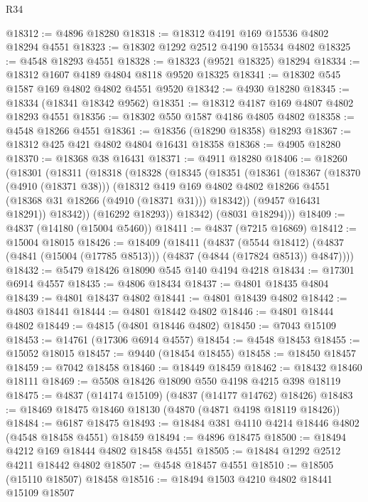 \begin{lexlean}{R34}
\begin{coremodule}
@18312 := @4896 @18280
@18318 := @18312 @4191 @169 @15536 @4802 @18294 @4551
@18323 := @18302 @1292 @2512 @4190 @15534 @4802
@18325 := @4548 @18293 @4551
@18328 := @18323 (@9521 @18325) @18294
@18334 := @18312 @1607 @4189 @4804 @8118 @9520 @18325
@18341 := @18302 @545 @1587 @169 @4802 @4802 @4551 @9520
@18342 := @4930 @18280
@18345 := @18334 (@18341 @18342 @9562)
@18351 := @18312 @4187 @169 @4807 @4802 @18293 @4551
@18356 := @18302 @550 @1587 @4186 @4805 @4802
@18358 := @4548 @18266 @4551
@18361 := @18356 (@18290 @18358) @18293
@18367 := @18312 @425 @421 @4802 @4804 @16431 @18358
@18368 := @4905 @18280
@18370 := @18368 @38 @16431
@18371 := @4911 @18280
@18406 := @18260
    (@18301
      (@18311
        (@18318
          (@18328
            (@18345
              (@18351
                (@18361
                  (@18367
                    (@18370 (@4910 (@18371 @38)))
                    (@18312
                      @419
                      @169
                      @4802
                      @4802
                      @18266
                      @4551
                      (@18368 @31 @18266 (@4910 (@18371 @31)))
                      @18342))
                  (@9457 @16431 @18291))
                @18342))
            (@16292 @18293))
          @18342)
        (@8031 @18294)))
@18409 := @4837 (@14180 (@15004 @5460))
@18411 := @4837 (@7215 @16869)
@18412 := @15004 @18015
@18426 := @18409
    (@18411
      (@4837
        (@5544 @18412)
        (@4837 (@4841 (@15004 (@17785 @8513))) (@4837 (@4844 (@17824 @8513)) @4847))))
@18432 := @5479 @18426 @18090 @545 @140 @4194 @4218
@18434 := @17301 @6914 @4557
@18435 := @4806 @18434
@18437 := @4801 @18435 @4804
@18439 := @4801 @18437 @4802
@18441 := @4801 @18439 @4802
@18442 := @4803 @18441
@18444 := @4801 @18442 @4802
@18446 := @4801 @18444 @4802
@18449 := @4815 (@4801 @18446 @4802)
@18450 := @7043 @15109
@18453 := @14761 (@17306 @6914 @4557)
@18454 := @4548 @18453
@18455 := @15052 @18015
@18457 := @9440 (@18454 @18455)
@18458 := @18450 @18457
@18459 := @7042 @18458
@18460 := @18449 @18459
@18462 := @18432 @18460 @18111
@18469 := @5508 @18426 @18090 @550 @4198 @4215 @398 @18119
@18475 := @4837 (@14174 @15109) (@4837 (@14177 @14762) @18426)
@18483 := @18469 @18475 @18460 @18130 (@4870 (@4871 @4198 @18119 @18426))
@18484 := @6187 @18475
@18493 := @18484 @381 @4110 @4214 @18446 @4802 (@4548 @18458 @4551) @18459
@18494 := @4896 @18475
@18500 := @18494 @4212 @169 @18444 @4802 @18458 @4551
@18505 := @18484 @1292 @2512 @4211 @18442 @4802
@18507 := @4548 @18457 @4551
@18510 := @18505 (@15110 @18507) @18458
@18516 := @18494 @1503 @4210 @4802 @18441 @15109 @18507

\end{coremodule}
\end{lexlean}
